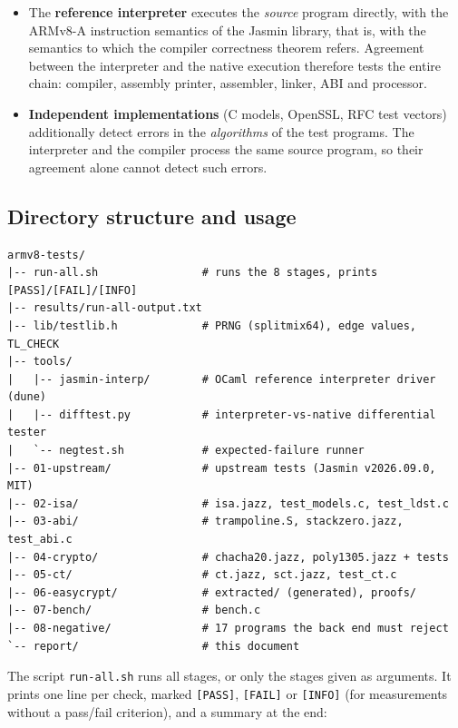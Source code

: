 \documentclass[11pt,a4paper]{article}
\newcommand{\file}[1]{\texttt{#1}}
\begin{document}
\begin{itemize}[leftmargin=*,itemsep=1pt]
  \item The \textbf{reference interpreter} executes the \emph{source}
        program directly, with the ARMv8-A instruction semantics of the
        Jasmin library, that is, with the semantics to which the compiler
        correctness theorem refers. Agreement between the interpreter and
        the native execution therefore tests the entire chain: compiler,
        assembly printer, assembler, linker, ABI and processor.
  \item \textbf{Independent implementations} (C models, OpenSSL, RFC test
        vectors) additionally detect errors in the \emph{algorithms} of the
        test programs. The interpreter and the compiler process the same
        source program, so their agreement alone cannot detect such errors.
\end{itemize}

\subsection{Directory structure and usage}

\begin{lstlisting}[style=output]
armv8-tests/
|-- run-all.sh                # runs the 8 stages, prints [PASS]/[FAIL]/[INFO]
|-- results/run-all-output.txt
|-- lib/testlib.h             # PRNG (splitmix64), edge values, TL_CHECK
|-- tools/
|   |-- jasmin-interp/        # OCaml reference interpreter driver (dune)
|   |-- difftest.py           # interpreter-vs-native differential tester
|   `-- negtest.sh            # expected-failure runner
|-- 01-upstream/              # upstream tests (Jasmin v2026.09.0, MIT)
|-- 02-isa/                   # isa.jazz, test_models.c, test_ldst.c
|-- 03-abi/                   # trampoline.S, stackzero.jazz, test_abi.c
|-- 04-crypto/                # chacha20.jazz, poly1305.jazz + tests
|-- 05-ct/                    # ct.jazz, sct.jazz, test_ct.c
|-- 06-easycrypt/             # extracted/ (generated), proofs/
|-- 07-bench/                 # bench.c
|-- 08-negative/              # 17 programs the back end must reject
`-- report/                   # this document
\end{lstlisting}

The script \file{run-all.sh} runs all stages, or only the stages given as
arguments. It prints one line per check, marked \texttt{[PASS]},
\texttt{[FAIL]} or \texttt{[INFO]} (for measurements without a pass/fail
criterion), and a summary at the end:
\end{document}
